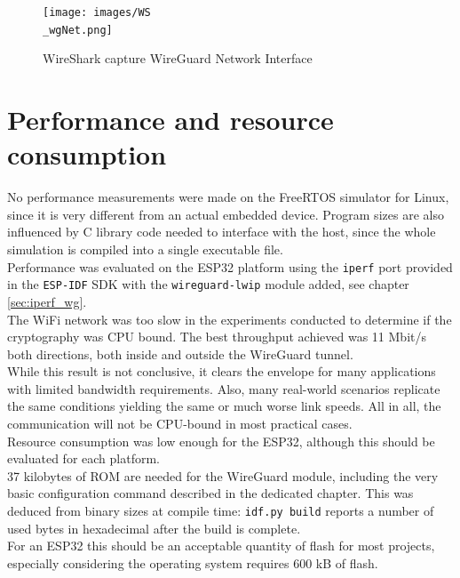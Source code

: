 \begin{figure}[H]
    \centering
    \vspace{0.5cm}
    \texttt{[image: images/WS\\\_wgNet.png]}
    \caption{WireShark capture WireGuard Network Interface}
    \label{fig:WSwg} %
\end{figure}

\section{Performance and resource consumption}\label{sec:performance}
No performance measurements were made on the FreeRTOS simulator for Linux, since it is very different from an actual embedded device.
Program sizes are also influenced by C library code needed to interface with the host, since the whole simulation is compiled into a single executable file.
\\Performance was evaluated on the ESP32 platform using the \texttt{iperf} port provided in the \texttt{ESP-IDF} SDK with the \texttt{wireguard-lwip} module added, see chapter \ref{sec:iperf_wg}.
\\The WiFi network was too slow in the experiments conducted to determine if the cryptography was CPU bound. The best throughput achieved was 11 Mbit/s both directions, both inside and outside the WireGuard tunnel.\\
While this result is not conclusive, it clears the envelope for many applications with limited bandwidth requirements.
Also, many real-world scenarios replicate the same conditions yielding the same or much worse link speeds.
All in all, the communication will not be CPU-bound in most practical cases.
\\Resource consumption was low enough for the ESP32, although this should be evaluated for each platform.\\
37 kilobytes of ROM are needed for the WireGuard module, including the very basic configuration command described in the dedicated chapter. This was deduced from binary sizes at compile time: \texttt{idf.py build} reports a number of used bytes in hexadecimal after the build is complete.\\
For an ESP32 this should be an acceptable quantity of flash for most projects, especially considering the operating system requires 600 kB of flash.
